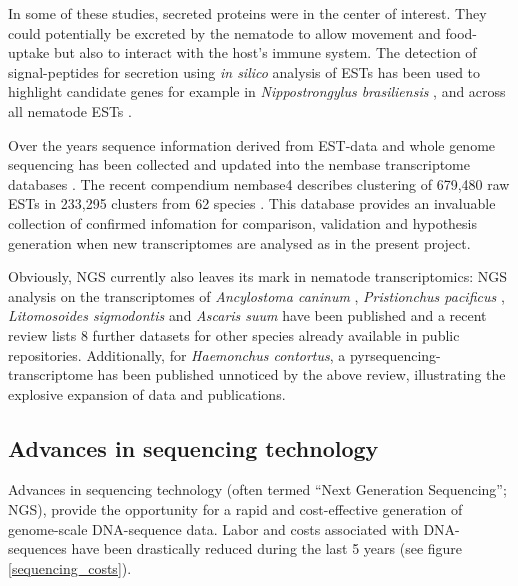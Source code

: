 In some of these studies, secreted proteins were in the center of
interest. They could potentially be excreted by the nematode to allow
movement and food-uptake but also to interact with the host's immune
system. The detection of signal-peptides for secretion using
\textit{in silico} analysis of ESTs has been used to highlight
candidate genes for example in \textit{Nippostrongylus brasiliensis}
\cite{harcus_signal_2004}, and across all nematode ESTs
\cite{nagaraj_needles_2008}.

Over the years sequence information derived from EST-data and whole
genome sequencing has been collected and updated into the nembase
transcriptome databases
\cite{parkinson_nembase:resource_2004,wasmuth_extent_2008}. The recent
compendium nembase4 describes clustering of 679,480 raw ESTs in
233,295 clusters from 62 species \cite{pmid21550347}. This database
provides an invaluable collection of confirmed infomation for
comparison, validation and hypothesis generation when new
transcriptomes are analysed as in the present project.

Obviously, NGS currently also leaves its mark in nematode
transcriptomics: NGS analysis on the transcriptomes of
\textit{Ancylostoma caninum} \cite{pmid20470405}, \textit{Pristionchus
  pacificus} \cite{pmid20237107}, \textit{Litomosoides sigmodontis}
\cite{pmid20950480} and \textit{Ascaris suum} \cite{pmid21685128} have
been published and a recent review \cite{pmid22044053} lists 8 further
datasets for other species already available in public
repositories. Additionally, for \textit{Haemonchus contortus}, a
pyrsequencing-transcriptome has been published \cite{pmid20420710}
unnoticed by the above review, illustrating the explosive expansion of
data and publications.

\subsection{Advances in sequencing technology}
\label{sec:ad-seq}

Advances in sequencing technology (often termed ``Next Generation
Sequencing''; NGS), provide the opportunity for a rapid and
cost-effective generation of genome-scale DNA-sequence data. Labor and
costs associated with DNA-sequences have been drastically reduced
during the last 5 years (see figure \ref{sequencing_costs}).



